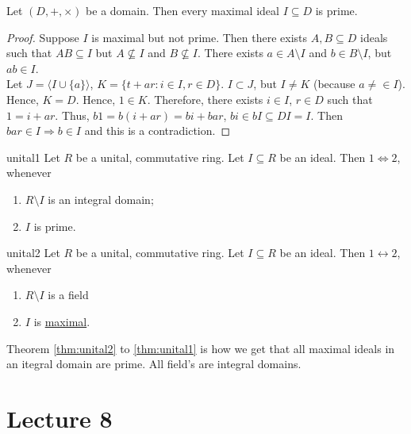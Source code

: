 \documentclass[twoside, openright, fontsize=10pt, headings=big]{scrbook}
\begin{document}
\begin{proposition}{}{}
Let $(D,+,\times)$ be a domain. Then every maximal ideal $I\subseteq D$ is prime.
\end{proposition}
\begin{proof}
    Suppose $I$ is maximal but not prime. Then there exists $A,B\subseteq D$ ideals such that  $AB\subseteq I$ but $A\nsubseteq I$ and $B\nsubseteq I$. There exists $a\in A\setminus I$ and $b\in B\setminus I$, but $ab\in I$.\\
    Let $J=\langle I\cup \{a\}\rangle$, $K=\{t+ar:i\in I,r\in D\}$. $I\subset J$, but $I\neq K$ (because $a\neq\in I$). Hence, $K=D$. Hence, $1\in K$. Therefore, there exists $i\in I$, $r\in D$ such that $1=i+ar$. Thus, $b1=b(i+ar)=bi+bar$, $bi\in bI\subseteq DI=I$. Then $bar\in I\Rightarrow b\in I$ and this is a contradiction.
\end{proof}
\begin{theorem}{}{unital1}
    Let $R$ be a unital, commutative ring. Let $I\subseteq R$ be an ideal. Then $1\Leftrightarrow 2$, whenever
    \begin{enumerate}
        \item $R\setminus I$ is an integral domain;
        \item $I$ is prime.
    \end{enumerate}
\end{theorem}
\begin{theorem}{}{unital2}
    Let $R$ be a unital, commutative ring. Let $I\subseteq R$ be an ideal. Then $1\leftrightarrow2$, whenever
    \begin{enumerate}
        \item $R\setminus I$ is a field
        \item $I$ is \underline{maximal}.
    \end{enumerate}
\end{theorem}
Theorem \ref{thm:unital2} to \ref{thm:unital1} is how we get that all maximal ideals in an itegral domain are prime. All field's are integral domains.

\chapter{Lecture 8}
\end{document}
